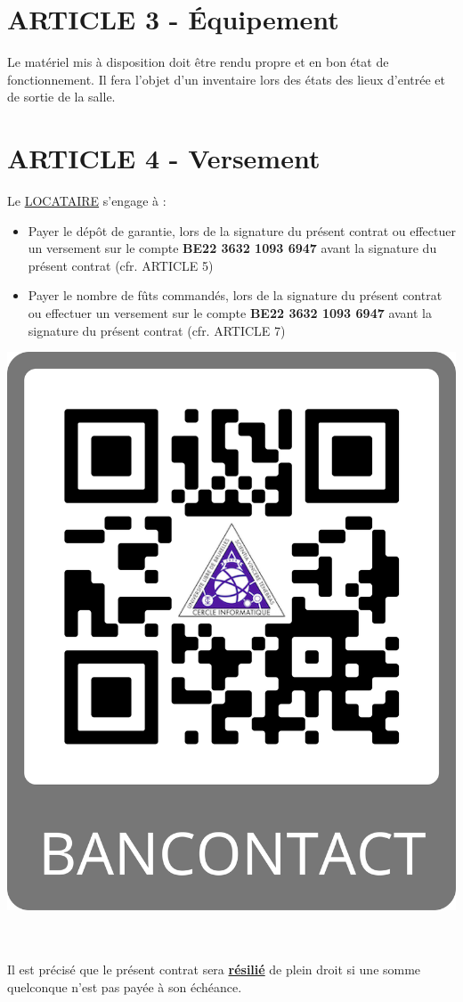 \documentclass{article}
\begin{document}
\section*{ARTICLE 3 - Équipement}
Le matériel mis à disposition doit être rendu propre et en bon état de fonctionnement. Il fera l’objet d’un inventaire lors des états des lieux d’entrée et de sortie de la salle.

\section*{ARTICLE 4 - Versement}
Le \underline{LOCATAIRE} s’engage à :

\begin{minipage}{0.6\textwidth}
\begin{itemize}
    \item Payer le dépôt de garantie, lors de la signature du présent contrat ou effectuer un versement sur le compte \textbf{BE22 3632 1093 6947} avant la signature du présent contrat (cfr. ARTICLE 5)
    \item Payer le nombre de fûts commandés, lors de la signature du présent contrat ou effectuer un versement sur le compte \textbf{BE22 3632 1093 6947} avant la signature du présent contrat (cfr. ARTICLE 7)
\end{itemize}
\end{minipage}
\begin{minipage}{0.4\textwidth}\raggedleft
\includegraphics[scale=0.04]{images/QRCodeBancontact.png}
\end{minipage}\\\\
Il est précisé que le présent contrat sera \textbf{\underline{résilié}} de plein droit si une somme quelconque n’est pas payée à son échéance.
\end{document}
